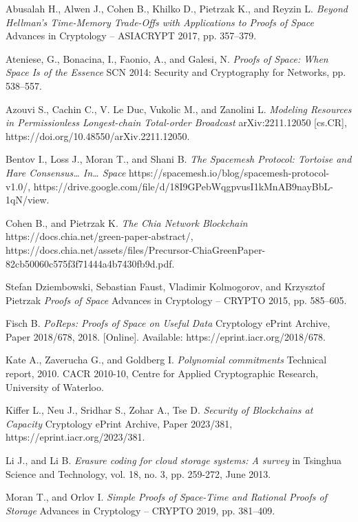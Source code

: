 \documentclass[conference]{IEEEtran}
\begin{document}
\begin{thebibliography}{9}

Abusalah H., Alwen J., Cohen B., Khilko D., Pietrzak K., and Reyzin L.
\emph{Beyond Hellman’s Time-Memory Trade-Offs with Applications to Proofs of Space}
Advances in Cryptology -- ASIACRYPT 2017, pp. 357–379.

Ateniese, G., Bonacina, I., Faonio, A., and Galesi, N.
\emph{Proofs of Space: When Space Is of the Essence}
SCN 2014: Security and Cryptography for Networks, pp. 538–557.

Azouvi S., Cachin C., V. Le Duc, Vukolic M., and Zanolini L.
\emph{Modeling Resources in Permissionless Longest-chain Total-order Broadcast}
arXiv:2211.12050 [cs.CR],
https://doi.org/10.48550/arXiv.2211.12050.

Bentov I., Loss J., Moran T., and Shani B.
\emph{The Spacemesh Protocol: Tortoise and Hare Consensus… In… Space}
https://spacemesh.io/blog/spacemesh-protocol-v1.0/,
https://drive.google.com/file/d/18I9GPebWqgpvusI1kMnAB9nayBbL-1qN/view.

Cohen B., and Pietrzak K.
\emph{The Chia Network Blockchain}
https://docs.chia.net/green-paper-abstract/,
https://docs.chia.net/assets/files/Precursor-ChiaGreenPaper-82cb50060c575f3f71444a4b7430fb9d.pdf.

Stefan Dziembowski, Sebastian Faust, Vladimir Kolmogorov, and Krzysztof Pietrzak
\emph{Proofs of Space}
Advances in Cryptology -- CRYPTO 2015, pp. 585–605.

Fisch B. \emph{PoReps: Proofs of Space on Useful Data} Cryptology ePrint Archive, Paper 2018/678, 2018. [Online]. Available: https://eprint.iacr.org/2018/678.

Kate A., Zaverucha G., and Goldberg I.  \emph{Polynomial commitments} Technical report, 2010. CACR 2010-10, Centre for Applied Cryptographic Research, University of Waterloo.

Kiffer L., Neu J., Sridhar S., Zohar A., Tse D.
\emph{Security of Blockchains at Capacity}
Cryptology ePrint Archive, Paper 2023/381,
https://eprint.iacr.org/2023/381.

Li J., and Li  B. \emph{Erasure coding for cloud storage systems: A survey} in Tsinghua Science and Technology, vol. 18, no. 3, pp. 259-272, June 2013.

Moran T., and Orlov I.
\emph{Simple Proofs of Space-Time and Rational Proofs of Storage}
Advances in Cryptology -- CRYPTO 2019, pp. 381–409.


\end{thebibliography}
\end{document}
